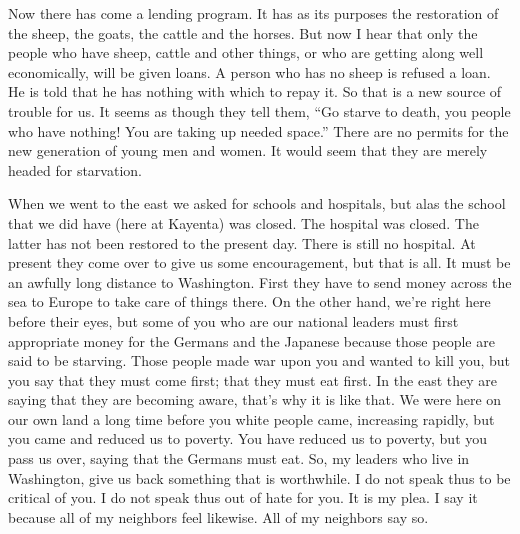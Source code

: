 Now there has come a lending program. It has as its purposes the restoration of the sheep, the goats, the cattle and the horses. But now I hear that only the people who have sheep, cattle and other things, or who are getting along well economically, will be given loans. A person who has no sheep is refused a loan. He is told that he has nothing with which to repay it. So that is a new source of trouble for us. It seems as though they tell them, ``Go starve to death, you people who have nothing! You are taking up needed space.'' There are no permits for the new generation of young men and women. It would seem that they are merely headed for starvation.

When we went to the east we asked for schools and hospitals, but alas the school that we did have (here at Kayenta) was closed. The hospital was closed. The latter has not been restored to the present day. There is still no hospital. At present they come over to give us some encouragement, but that is all. It must be an awfully long distance to Washington. First they have to send money across the sea to Europe to take care of things there. On the other hand, we're right here before their eyes, but some of you who are our national leaders must first appropriate money for the Germans and the Japanese because those people are said to be starving. Those people made war upon you and wanted to kill you, but you say that they must come first; that they must eat first. In the east they are saying that they are becoming aware, that's why it is like that. We were here on our own land a long time before you white people came, increasing rapidly, but you came and reduced us to poverty. You have reduced us to poverty, but you pass us over, saying that the Germans must eat. So, my leaders who live in Washington, give us back something that is worthwhile. I do not speak thus to be critical of you. I do not speak thus out of hate for you. It is my plea. I say it because all of my neighbors feel likewise. All of my neighbors say so.